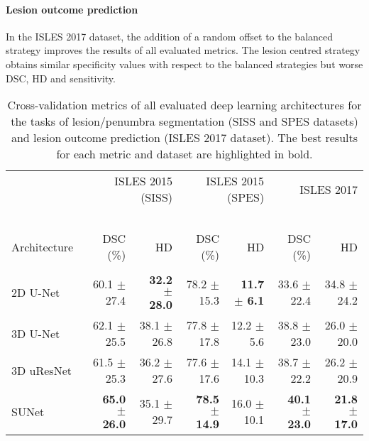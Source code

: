 \documentclass[letterpaper,final,authoryear,3p,times,twocolumn]{elsarticle}
\begin{document}
\paragraph{Lesion outcome prediction} In the ISLES 2017 dataset, the addition of a random offset to the balanced strategy improves the results of all evaluated metrics. The lesion centred strategy obtains similar specificity values with respect to the balanced strategies but worse DSC, HD and sensitivity.

\begin{table*}
	\centering
	\caption{Cross-validation metrics of all evaluated deep learning architectures for the tasks of lesion/penumbra segmentation (SISS and SPES datasets) and lesion outcome prediction (ISLES 2017 dataset). The best results for each metric and dataset are highlighted in bold.}
	\label{table:architectures}
	\begin{tabular}{lrrrrrr}
		& \multicolumn{2}{r}{ISLES 2015 (SISS)} & \multicolumn{2}{r}{ISLES 2015 (SPES)} & \multicolumn{2}{r}{ISLES 2017} \\ [-0.6em]
		~ & \multicolumn{2}{l}{\hrulefill} & \multicolumn{2}{l}{\hrulefill} & \multicolumn{2}{l}{\hrulefill} \\ 
		Architecture~ & DSC (\%) & HD & DSC (\%) & HD & DSC (\%) & HD \\ [-0.6em]
		\multicolumn{1}{l}{\hrulefill} & \multicolumn{1}{l}{\hrulefill} & \multicolumn{1}{l}{\hrulefill} & \multicolumn{1}{l}{\hrulefill} & \multicolumn{1}{l}{\hrulefill} & \multicolumn{1}{l}{\hrulefill} & \multicolumn{1}{l}{\hrulefill} \\ 
		2D U-Net & 60.1 $\pm$ 27.4 & \textbf{32.2 $\pm$ 28.0} & 78.2 $\pm$ 15.3 & \textbf{11.7 $\pm$ 6.1} & 33.6 $\pm$ 22.4 & 34.8 $\pm$ 24.2 \\
		3D U-Net & 62.1 $\pm$ 25.5 & 38.1 $\pm$ 26.8 & 77.8 $\pm$ 17.8 & 12.2 $\pm$ 5.6 & 38.8 $\pm$ 23.0 & 26.0 $\pm$ 20.0 \\
		3D uResNet & 61.5 $\pm$ 25.3 & 36.2 $\pm$ 27.6 & 77.6 $\pm$ 17.6 & 14.1 $\pm$ 10.3 & 38.7 $\pm$ 22.2 & 26.2 $\pm$ 20.9 \\
		SUNet & \textbf{65.0 $\pm$ 26.0} & 35.1 $\pm$ 29.7 & \textbf{78.5 $\pm$ 14.9} & 16.0 $\pm$ 10.1 & \textbf{40.1 $\pm$ 23.0} & \textbf{21.8 $\pm$ 17.0}
	\end{tabular}
\end{table*}
\end{document}

